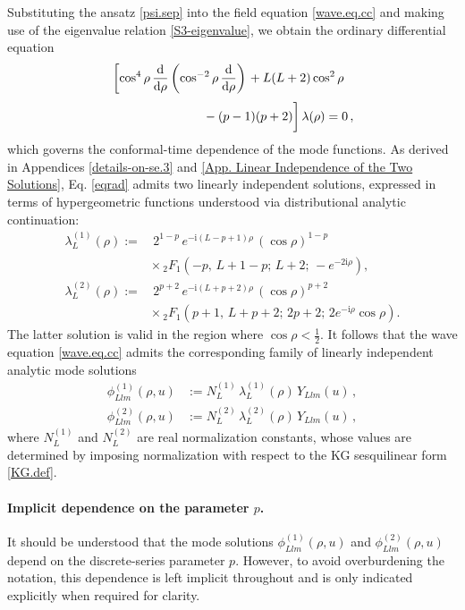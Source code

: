 \documentclass[aps,twocolumn,nofootinbib]{revtex4}
\begin{document}
Substituting the ansatz \eqref{psi.sep} into the field equation \eqref{wave.eq.cc} and making use of the eigenvalue relation \eqref{S3-eigenvalue}, we obtain the ordinary differential equation
\begin{align} \label{eqrad}
    &\left[\cos_{}^4 \rho \,\frac{\mathrm{d}}{\mathrm{d}\rho} \left( \cos_{}^{-2} \rho \,\frac{\mathrm{d}}{\mathrm{d}\rho} \right) \right. + L(L+2) \cos_{}^2 \rho \nonumber \\[3pt]
    &\hspace{2.5cm} \left. \vphantom{\frac{\mathrm{d}}{\mathrm{d}\rho}} - (p-1)(p+2) \right] \lambda(\rho) = 0 \,, 
\end{align}
which governs the conformal-time dependence of the mode functions. As derived in Appendices \ref{details-on-se.3} and \ref{App. Linear Independence of the Two Solutions}, Eq. \eqref{eqrad} admits two linearly independent solutions, expressed in terms of hypergeometric functions understood via distributional analytic continuation:
\begin{align}
    \lambda_L^{(1)}(\rho) :=&\, 2^{1-p}\,e_{}^{-\mathrm{i}(L-p+1)\rho}\,(\cos\rho)_{}^{1-p}\nonumber\\[3pt]
    &\times\, {}_2F_1^{}\left(-p,\,L+1-p;\,L+2;\,-e_{}^{-2\mathrm{i}\rho}\right) , \label{chi_p-1}\\[6pt]
    \lambda^{(2)}_L(\rho) :=&\, 2^{p+2}\,e^{-\mathrm{i}(L+p+2)\rho}\,(\cos\rho)^{p+2}\nonumber\\[3pt]
    &\times\, {}_2F_1^{}\left(p+1,\,L+p+2;\,2p+2;\, 2e^{-\mathrm{i}\rho}\cos\rho \right) . \label{chi_p-2}
\end{align}
The latter solution is valid in the region where $\cos\rho <\frac{1}{2}$. It follows that the wave equation \eqref{wave.eq.cc} admits the corresponding family of linearly independent analytic mode solutions
\begin{align} \label{ModeNaive}
    \phi^{(1)}_{Llm}(\rho,u) &:= N_L^{(1)}\, \lambda_L^{(1)}(\rho)\,Y_{Llm}^{}(u)\,, \nonumber\\[3pt]
    \phi^{(2)}_{Llm}(\rho,u) &:= N_L^{(2)}\, \lambda_L^{(2)}(\rho)\,Y_{Llm}^{}(u) \,,
\end{align}
where $N_L^{(1)}$ and $N_L^{(2)}$ are real normalization constants, whose values are determined by imposing normalization with respect to the KG sesquilinear form \eqref{KG.def}.

\paragraph{Implicit dependence on the parameter $p$.} It should be understood that the mode solutions $\phi^{(1)}_{Llm}(\rho,u)$ and $\phi^{(2)}_{Llm}(\rho,u)$ depend on the discrete-series parameter $p$. However, to avoid overburdening the notation, this dependence is left implicit throughout and is only indicated explicitly when required for clarity.
\end{document}
